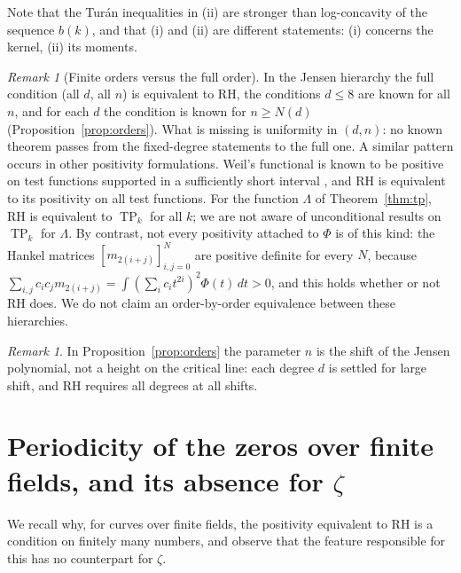 \documentclass[11pt]{amsart}
\theoremstyle{definition}
\theoremstyle{remark}
\newtheorem{remark}[theorem]{Remark}
\DeclareMathOperator{\TP}{TP}
\begin{document}
Note that the Tur\'an inequalities in (ii) are stronger than log-concavity of
the sequence $b(k)$, and that (i) and (ii) are different statements: (i)
concerns the kernel, (ii) its moments.

\begin{remark}[Finite orders versus the full order]\label{thm:gap}
In the Jensen hierarchy the full condition (all $d$, all $n$) is equivalent to
RH, the conditions $d\le 8$ are known for all $n$, and for each $d$ the
condition is known for $n\ge N(d)$ (Proposition~\ref{prop:orders}). What is
missing is uniformity in $(d,n)$: no known theorem passes from the
fixed-degree statements to the full one. A similar pattern occurs in other
positivity formulations. Weil's functional \cite{Weil52} is known to be
positive on test functions supported in a sufficiently short interval
\cite{Yoshida92,ConnesConsani21}, and RH is equivalent to its positivity on
all test functions. For the function $\Lambda$ of Theorem~\ref{thm:tp}, RH is
equivalent to $\TP_k$ for all $k$; we are not aware of unconditional results
on $\TP_k$ for $\Lambda$. By contrast, not every positivity attached to
$\Phi$ is of this kind: the Hankel matrices $[m_{2(i+j)}]_{i,j=0}^{N}$ are
positive definite for every $N$, because
$\sum_{i,j}c_ic_jm_{2(i+j)}=\int(\sum_ic_it^{2i})^2\Phi(t)\,dt>0$, and this
holds whether or not RH does. We do not claim an order-by-order equivalence
between these hierarchies.
\end{remark}

\begin{remark}
In Proposition~\ref{prop:orders} the parameter $n$ is the shift of the Jensen
polynomial, not a height on the critical line: each degree $d$ is settled for
large shift, and RH requires all degrees at all shifts.
\end{remark}

\section{Periodicity of the zeros over finite fields, and its absence for
\texorpdfstring{$\zeta$}{zeta}}\label{sec:fin}

We recall why, for curves over finite fields, the positivity equivalent to RH
is a condition on finitely many numbers, and observe that the feature
responsible for this has no counterpart for $\zeta$.
\end{document}
